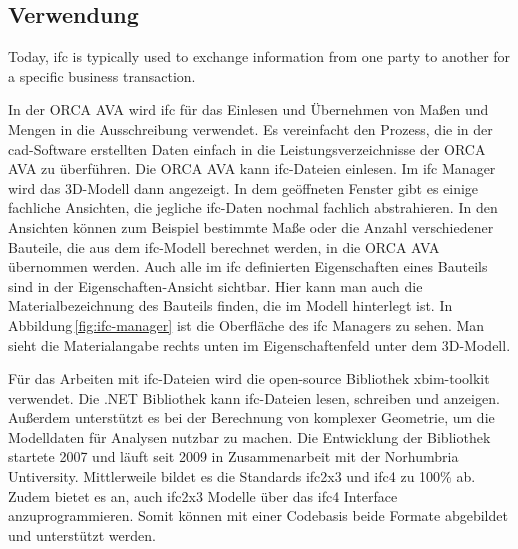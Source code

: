 \subsection{Verwendung}
\label{c:basics:ifc:usage}
\begin{displayquote}
	\glqq Today, \ac{ifc} is typically used to exchange information from one party to another for a specific business transaction.\grqq{} \citep{BuildingSMART_IFC}
\end{displayquote}
In der ORCA AVA wird \ac{ifc} für das Einlesen und Übernehmen von Maßen und Mengen in die Ausschreibung verwendet. Es vereinfacht den Prozess, die in der \ac{cad}-Software erstellten Daten einfach in die Leistungsverzeichnisse der ORCA AVA zu überführen.
Die ORCA AVA kann \ac{ifc}-Dateien einlesen. Im \ac{ifc} Manager wird das 3D-Modell dann angezeigt. In dem geöffneten Fenster gibt es einige fachliche Ansichten, die jegliche \ac{ifc}-Daten nochmal fachlich abstrahieren. In den Ansichten können zum Beispiel bestimmte Maße oder die Anzahl verschiedener Bauteile, die aus dem \ac{ifc}-Modell berechnet werden, in die ORCA AVA übernommen werden. Auch alle im \ac{ifc} definierten Eigenschaften eines Bauteils sind in der Eigenschaften-Ansicht sichtbar. Hier kann man auch die Materialbezeichnung des Bauteils finden, die im Modell hinterlegt ist. In Abbildung\,\ref{fig:ifc-manager} ist die Oberfläche des \ac{ifc} Managers zu sehen. Man sieht die Materialangabe rechts unten im Eigenschaftenfeld unter dem 3D-Modell.

Für das Arbeiten mit \ac{ifc}-Dateien wird die open-source Bibliothek xbim-toolkit verwendet. Die .NET Bibliothek kann \ac{ifc}-Dateien lesen, schreiben und anzeigen. Außerdem unterstützt es bei der Berechnung von komplexer Geometrie, um die Modelldaten für Analysen nutzbar zu machen. Die Entwicklung der Bibliothek startete 2007 und läuft seit 2009 in Zusammenarbeit mit der Norhumbria Untiversity. Mittlerweile bildet es die Standards \ac{ifc2x3} und \ac{ifc4} zu 100\% ab. Zudem bietet es an, auch \ac{ifc2x3} Modelle über das \ac{ifc4} Interface anzuprogrammieren. Somit können mit einer Codebasis beide Formate abgebildet und unterstützt werden. \citep{Xbim_ltd_history}


